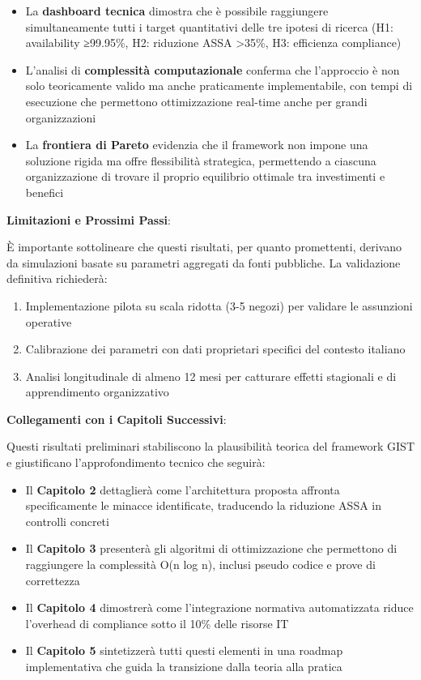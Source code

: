 \begin{itemize}
    \item La \textbf{dashboard tecnica} dimostra che è possibile raggiungere simultaneamente tutti i target quantitativi delle tre ipotesi di ricerca (H1: availability ≥99.95\%, H2: riduzione ASSA >35\%, H3: efficienza compliance)
    
    \item L'analisi di \textbf{complessità computazionale} conferma che l'approccio è non solo teoricamente valido ma anche praticamente implementabile, con tempi di esecuzione che permettono ottimizzazione real-time anche per grandi organizzazioni
    
    \item La \textbf{frontiera di Pareto} evidenzia che il framework non impone una soluzione rigida ma offre flessibilità strategica, permettendo a ciascuna organizzazione di trovare il proprio equilibrio ottimale tra investimenti e benefici
\end{itemize}

\textbf{Limitazioni e Prossimi Passi}:

È importante sottolineare che questi risultati, per quanto promettenti, derivano da simulazioni basate su parametri aggregati da fonti pubbliche. La validazione definitiva richiederà:

\begin{enumerate}
    \item Implementazione pilota su scala ridotta (3-5 negozi) per validare le assunzioni operative
    \item Calibrazione dei parametri con dati proprietari specifici del contesto italiano
    \item Analisi longitudinale di almeno 12 mesi per catturare effetti stagionali e di apprendimento organizzativo
\end{enumerate}

\textbf{Collegamenti con i Capitoli Successivi}:

Questi risultati preliminari stabiliscono la plausibilità teorica del framework GIST e giustificano l'approfondimento tecnico che seguirà:

\begin{itemize}
    \item Il \textbf{Capitolo 2} dettaglierà come l'architettura proposta affronta specificamente le minacce identificate, traducendo la riduzione ASSA in controlli concreti
    
    \item Il \textbf{Capitolo 3} presenterà gli algoritmi di ottimizzazione che permettono di raggiungere la complessità O(n log n), inclusi pseudo codice e prove di correttezza
    
    \item Il \textbf{Capitolo 4} dimostrerà come l'integrazione normativa automatizzata riduce l'overhead di compliance sotto il 10\% delle risorse IT
    
    \item Il \textbf{Capitolo 5} sintetizzerà tutti questi elementi in una roadmap implementativa che guida la transizione dalla teoria alla pratica
\end{itemize}

